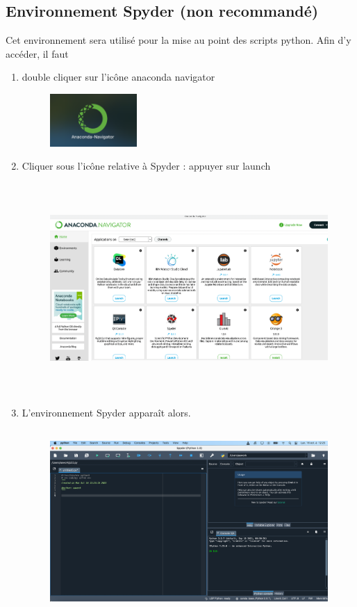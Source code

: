 \documentclass[a4paper,12pt]{article}
\begin{document}
\subsection{Environnement Spyder (non recommandé)}
Cet environnement sera utilisé pour la mise au point des scripts python.
Afin d'y acc\'eder, il faut
\begin{enumerate}
\item double cliquer sur l'ic\^one anaconda navigator
\begin{figure}[h]
\begin{center}
\includegraphics[height=2cm]{./png/anaconda-navigator}
\end{center}
\end{figure}
\item Cliquer sous l'ic\^one relative \`a Spyder : appuyer sur launch
\begin{figure}[h]
\begin{center}
\includegraphics[height=8cm]{./png/menu-anaconda-navigator}
\end{center}
\end{figure}
\item L'environnement Spyder appara\^it alors.
\begin{figure}[h]
\begin{center}
\includegraphics[height=7cm]{./png/menu-spyder}
\end{center}
\end{figure}

\end{enumerate}
\clearpage
\end{document}
